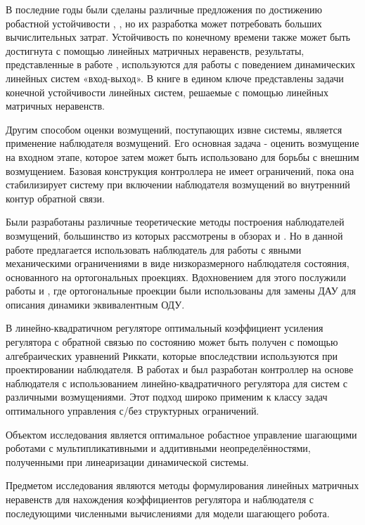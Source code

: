 В последние годы были сделаны различные предложения по достижению робастной устойчивости \cite{LMI7}, \cite{LMI8}, но их разработка может потребовать больших вычислительных затрат.
Устойчивость по конечному времени также может быть достигнута с помощью линейных матричных неравенств, результаты, представленные в работе \cite{LMI6}, используются для работы с поведением динамических линейных систем «вход-выход». В книге \cite{Amato2011} в едином ключе представлены задачи конечной устойчивости линейных систем, решаемые с помощью линейных матричных неравенств.

Другим способом оценки возмущений, поступающих извне системы, является применение наблюдателя возмущений. Его основная задача - оценить возмущение на входном этапе, которое затем может быть использовано для борьбы с внешним возмущением. Базовая конструкция контроллера не имеет ограничений, пока она стабилизирует систему при включении наблюдателя возмущений во внутренний контур обратной связи.

Были разработаны различные теоретические методы построения наблюдателей возмущений, большинство из которых рассмотрены в обзорах \cite{ObserverITMO} и \cite{Disturb_obs}. Но в данной работе предлагается использовать наблюдатель для работы с явными механическими ограничениями в виде низкоразмерного наблюдателя состояния, основанного на ортогональных проекциях. Вдохновением для этого послужили работы \cite{SAVIN2021} и \cite{Righetti2011}, где ортогональные проекции были использованы для замены ДАУ для описания динамики эквивалентным ОДУ. 

В линейно-квадратичном регуляторе оптимальный коэффициент усиления регулятора с обратной связью по состоянию может быть получен с помощью алгебраических уравнений Риккати, которые впоследствии используются при проектировании наблюдателя. В работах \cite{LQR1} и \cite{LQR2} был разработан контроллер на основе наблюдателя с использованием линейно-квадратичного регулятора для систем с различными возмущениями. Этот подход широко применим к классу задач оптимального управления с/без структурных ограничений. 

{\objectsubject} 

Объектом исследования является оптимальное робастное управление шагающими роботами с мультипликативными и аддитивными неопределённостями, полученными при линеаризации динамической системы.

Предметом исследования являются методы формулирования линейных матричных неравенств для нахождения коэффициентов регулятора и наблюдателя с последующими численными вычислениями для модели шагающего робота.

